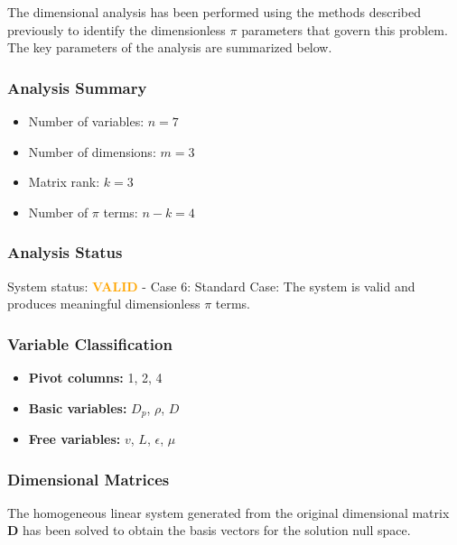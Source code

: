 The dimensional analysis has been performed using the methods described previously to identify the dimensionless $\pi$ parameters that govern this problem. The key parameters of the analysis are summarized below.

\subsubsection*{Analysis Summary}
\begin{itemize}
\item Number of variables: $n = 7$
\item Number of dimensions: $m = 3$
\item Matrix rank: $k = 3$
\item Number of $\pi$ terms: $n - k = 4$
\end{itemize}

\subsubsection*{Analysis Status}
System status: \textcolor{orange}{\textbf{VALID}} - Case 6: Standard Case: The system is valid and produces meaningful dimensionless $\pi$ terms.

\subsubsection*{Variable Classification}
\begin{itemize}
\item \textbf{Pivot columns:} 1, 2, 4
\item \textbf{Basic variables:} $D_p$, $\rho$, $D$
\item \textbf{Free variables:} $v$, $L$, $\epsilon$, $\mu$
\end{itemize}

\subsubsection*{Dimensional Matrices}
The homogeneous linear system generated from the original dimensional matrix $\mathbf{D}$ has been solved to obtain the basis vectors for the solution null space.

